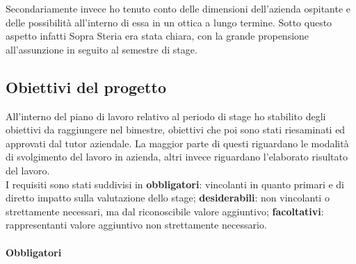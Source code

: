 Secondariamente invece ho tenuto conto delle dimensioni dell'azienda ospitante e delle possibilità all'interno di essa in un ottica a lungo termine. Sotto questo aspetto infatti Sopra Steria era stata chiara, con la grande propensione all'assunzione in seguito al semestre di stage.

\subsection{Obiettivi del progetto}
All'interno del piano di lavoro relativo al periodo di stage ho stabilito degli obiettivi da raggiungere nel bimestre, obiettivi che poi sono stati riesaminati ed approvati dal tutor aziendale. La maggior parte di questi riguardano le modalità di svolgimento del lavoro in azienda, altri invece riguardano l'elaborato risultato del lavoro.\\

I requisiti sono stati suddivisi in \textbf{obbligatori}: vincolanti in quanto primari e di diretto impatto sulla valutazione dello stage; \textbf{desiderabili}: non vincolanti o strettamente necessari, ma dal riconoscibile valore aggiuntivo; \textbf{facoltativi}: rappresentanti valore aggiuntivo non strettamente necessario.

	\paragraph{Obbligatori}


